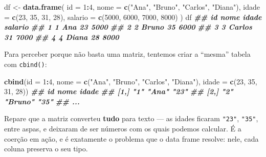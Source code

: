 \documentclass[
  portuguese,
  11pt,
  openany]{book}
\newenvironment{Shaded}{\begin{snugshade}}{\end{snugshade}}
\newcommand{\AttributeTok}[1]{\textcolor[rgb]{0.13,0.29,0.53}{#1}}
\newcommand{\DecValTok}[1]{\textcolor[rgb]{0.00,0.00,0.81}{#1}}
\newcommand{\DocumentationTok}[1]{\textcolor[rgb]{0.56,0.35,0.01}{\textbf{\textit{#1}}}}
\newcommand{\FunctionTok}[1]{\textcolor[rgb]{0.13,0.29,0.53}{\textbf{#1}}}
\newcommand{\NormalTok}[1]{#1}
\newcommand{\OtherTok}[1]{\textcolor[rgb]{0.56,0.35,0.01}{#1}}
\newcommand{\SpecialCharTok}[1]{\textcolor[rgb]{0.81,0.36,0.00}{\textbf{#1}}}
\newcommand{\StringTok}[1]{\textcolor[rgb]{0.31,0.60,0.02}{#1}}
\begin{document}
\begin{Shaded}
\begin{Highlighting}[]
\NormalTok{df }\OtherTok{\textless{}{-}} \FunctionTok{data.frame}\NormalTok{(}
  \AttributeTok{id =} \DecValTok{1}\SpecialCharTok{:}\DecValTok{4}\NormalTok{,}
  \AttributeTok{nome =} \FunctionTok{c}\NormalTok{(}\StringTok{"Ana"}\NormalTok{, }\StringTok{"Bruno"}\NormalTok{, }\StringTok{"Carlos"}\NormalTok{, }\StringTok{"Diana"}\NormalTok{),}
  \AttributeTok{idade =} \FunctionTok{c}\NormalTok{(}\DecValTok{23}\NormalTok{, }\DecValTok{35}\NormalTok{, }\DecValTok{31}\NormalTok{, }\DecValTok{28}\NormalTok{),}
  \AttributeTok{salario =} \FunctionTok{c}\NormalTok{(}\DecValTok{5000}\NormalTok{, }\DecValTok{6000}\NormalTok{, }\DecValTok{7000}\NormalTok{, }\DecValTok{8000}\NormalTok{)}
\NormalTok{)}
\NormalTok{df}
\DocumentationTok{\#\#   id   nome idade salario}
\DocumentationTok{\#\# 1  1    Ana    23    5000}
\DocumentationTok{\#\# 2  2  Bruno    35    6000}
\DocumentationTok{\#\# 3  3 Carlos    31    7000}
\DocumentationTok{\#\# 4  4  Diana    28    8000}
\end{Highlighting}
\end{Shaded}

Para perceber porque não basta uma matriz, tentemos criar a ``mesma'' tabela com
\texttt{cbind()}:

\begin{Shaded}
\begin{Highlighting}[]
\FunctionTok{cbind}\NormalTok{(}\AttributeTok{id =} \DecValTok{1}\SpecialCharTok{:}\DecValTok{4}\NormalTok{, }\AttributeTok{nome =} \FunctionTok{c}\NormalTok{(}\StringTok{"Ana"}\NormalTok{, }\StringTok{"Bruno"}\NormalTok{, }\StringTok{"Carlos"}\NormalTok{, }\StringTok{"Diana"}\NormalTok{),}
      \AttributeTok{idade =} \FunctionTok{c}\NormalTok{(}\DecValTok{23}\NormalTok{, }\DecValTok{35}\NormalTok{, }\DecValTok{31}\NormalTok{, }\DecValTok{28}\NormalTok{))}
\DocumentationTok{\#\#      id  nome     idade }
\DocumentationTok{\#\# [1,] "1" "Ana"    "23"  }
\DocumentationTok{\#\# [2,] "2" "Bruno"  "35"  }
\DocumentationTok{\#\# ...}
\end{Highlighting}
\end{Shaded}

Repare que a matriz converteu \textbf{tudo} para texto --- as idades ficaram \texttt{"23"},
\texttt{"35"}, entre aspas, e deixaram de ser números com os quais podemos calcular. É a
coerção em ação, e é exatamente o problema que o data frame resolve: nele, cada
coluna preserva o seu tipo.
\end{document}
